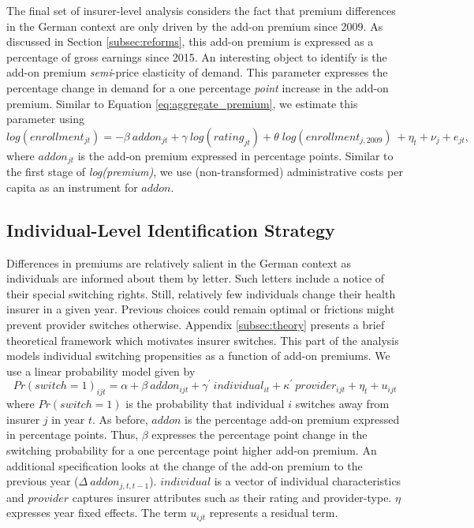 \documentclass[a4paper, 11pt, english]{article}
\begin{document}
The final set of insurer-level analysis considers the fact that premium differences in the German context are only driven by the add-on premium since 2009. As discussed in Section \ref{subsec:reforms}, this add-on premium is expressed as a percentage of gross earnings since 2015. An interesting object to identify is the add-on premium \textit{semi}-price elasticity of demand. This parameter expresses the percentage change in demand for a one percentage \textit{point} increase in the add-on premium. Similar to Equation \eqref{eq:aggregate_premium}, we estimate this parameter using
\begin{equation}\label{eq:aggregate_addon}
	log(enrollment_{jt})  = -\beta\ addon_{jt}  + \gamma \ log(rating_{jt}) + \theta \; log(enrollment_{j,2009})  \ + \eta_t + \nu_j + e_{jt},
\end{equation}
where $addon_{jt}$ is the add-on premium expressed in percentage points. Similar to the first stage of \textit{log(premium)}, we use (non-transformed) administrative costs per capita as an instrument for $\textit{addon}$.

\subsection{Individual-Level Identification Strategy \label{subsec:strategy_individual}}

Differences in premiums are relatively salient in the German context as individuals are informed about them by letter. Such letters include a notice of their special switching rights. Still, relatively few individuals change their health insurer in a given year. Previous choices could remain optimal or frictions might prevent provider switches otherwise. Appendix \ref{subsec:theory} presents a brief theoretical framework which motivates insurer switches. This part of the analysis models individual switching propensities as a function of add-on premiums. We use a linear probability model given by
\begin{equation}\label{eq:individual_addon}
	Pr(switch = 1)_{ijt} = \alpha + \beta\ addon_{ijt} + \gamma^{\prime} \  individual_{it} +  \kappa^{\prime} \  provider_{ijt} + \eta_t + u_{ijt}
\end{equation}	
where $Pr(switch = 1)$ is the probability that individual $i$ switches away from insurer $j$ in year $t$. As before, $addon$ is the percentage add-on premium expressed in percentage points. Thus, $\beta$ expresses the percentage point change in the switching probability for a one percentage point higher add-on premium. An additional specification looks at the change of the add-on premium to the previous year ($\Delta \ addon_{j,t,t-1}$). $individual$ is a vector of individual characteristics and $provider$ captures insurer attributes such as their rating and provider-type. $\eta$ expresses year fixed effects. The term $u_{ijt}$ represents a residual term.
\end{document}
